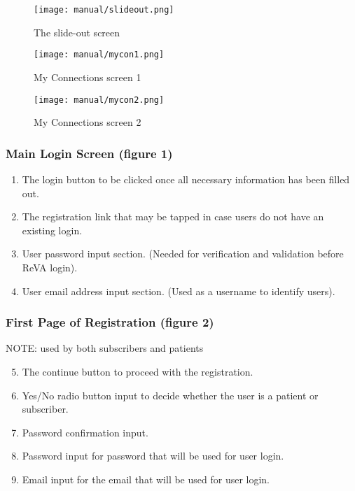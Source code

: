 \begin{figure}[h!]
\centering
\begin{minipage}{.5\textwidth}
  \centering
  \texttt{[image: manual/slideout.png]}
  \caption{\label{fig:slideout}The slide-out screen}
\end{minipage}%
\begin{minipage}{.5\textwidth}
  \centering
  \texttt{[image: manual/mycon1.png]}
  \caption{\label{fig:mycon1}My Connections screen 1}
\end{minipage}
\end{figure}

\begin{figure}[h!]
\centering
\begin{minipage}{.5\textwidth}
  \centering
  \texttt{[image: manual/mycon2.png]}
  \caption{\label{fig:mycon2}My Connections screen 2}
\end{minipage}%
\end{figure}


\clearpage
\pagebreak
\subsubsection{Main Login Screen (figure 1)}
\begin{enumerate}
   	\item The login button to be clicked once all necessary information has been filled out. 
   	\item The registration link that may be tapped in case users do not have an existing login. 
 	\item User password input section. (Needed for verification and validation before ReVA login). 
	\item User email address input section. (Used as a username to identify users). 
\end{enumerate}
\subsubsection{First Page of Registration (figure 2)}
NOTE: used by both subscribers and patients
\begin{enumerate}
\setcounter{enumi}{4}
	\item The continue button to proceed with the registration. 
	\item Yes/No radio button input to decide whether the user is a patient or subscriber. 
	\item Password confirmation input. 
	\item Password input for password that will be used for user login. 
	\item Email input for the email that will be used for user login. 
\end{enumerate}
